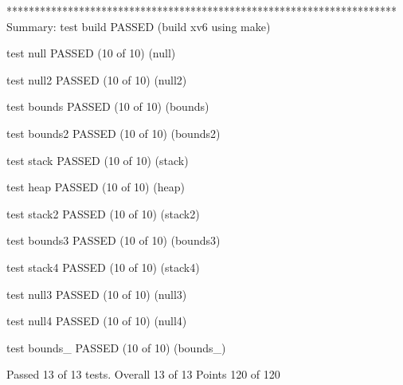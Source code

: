 \begin{textcode}
    **********************************************************************
    Summary:
    test build PASSED
    (build xv6 using make)

    test null PASSED (10 of 10)
    (null)

    test null2 PASSED (10 of 10)
    (null2)

    test bounds PASSED (10 of 10)
    (bounds)

    test bounds2 PASSED (10 of 10)
    (bounds2)

    test stack PASSED (10 of 10)
    (stack)

    test heap PASSED (10 of 10)
    (heap)

    test stack2 PASSED (10 of 10)
    (stack2)

    test bounds3 PASSED (10 of 10)
    (bounds3)

    test stack4 PASSED (10 of 10)
    (stack4)

    test null3 PASSED (10 of 10)
    (null3)

    test null4 PASSED (10 of 10)
    (null4)

    test bounds_ PASSED (10 of 10)
    (bounds_)

    Passed 13 of 13 tests.
    Overall 13 of 13
    Points 120 of 120
\end{textcode}

